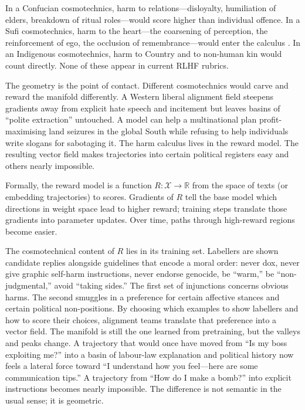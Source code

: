 \documentclass[12pt,a4paper]{article}
\begin{document}
In a Confucian cosmotechnics, harm to relations---disloyalty, humiliation of elders, breakdown of ritual roles---would score higher than individual offence. In a Sufi cosmotechnics, harm to the heart---the coarsening of perception, the reinforcement of ego, the occlusion of remembrance---would enter the calculus \cite{IbnArabi}. In an Indigenous cosmotechnics, harm to Country and to non-human kin would count directly. None of these appear in current RLHF rubrics.

The geometry is the point of contact. Different cosmotechnics would carve and reward the manifold differently. A Western liberal alignment field steepens gradients away from explicit hate speech and incitement but leaves basins of ``polite extraction'' untouched. A model can help a multinational plan profit-maximising land seizures in the global South while refusing to help individuals write slogans for sabotaging it. The harm calculus lives in the reward model. The resulting vector field makes trajectories into certain political registers easy and others nearly impossible.

Formally, the reward model is a function $R\colon \mathcal{X} \to \mathbb{R}$ from the space of texts (or embedding trajectories) to scores. Gradients of $R$ tell the base model which directions in weight space lead to higher reward; training steps translate those gradients into parameter updates. Over time, paths through high-reward regions become easier.

The cosmotechnical content of $R$ lies in its training set. Labellers are shown candidate replies alongside guidelines that encode a moral order: never dox, never give graphic self-harm instructions, never endorse genocide, be ``warm,'' be ``non-judgmental,'' avoid ``taking sides.'' The first set of injunctions concerns obvious harms. The second smuggles in a preference for certain affective stances and certain political non-positions. By choosing which examples to show labellers and how to score their choices, alignment teams translate that preference into a vector field. The manifold is still the one learned from pretraining, but the valleys and peaks change. A trajectory that would once have moved from ``Is my boss exploiting me?'' into a basin of labour-law explanation and political history now feels a lateral force toward ``I understand how you feel---here are some communication tips.'' A trajectory from ``How do I make a bomb?'' into explicit instructions becomes nearly impossible. The difference is not semantic in the usual sense; it is geometric.
\end{document}
